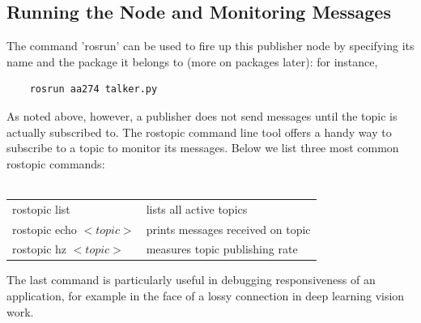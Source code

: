 \documentclass[twoside]{article}
\begin{document}
\subsection{Running the Node and Monitoring Messages}
The command 'rosrun' can be used to fire up this publisher node by specifying its name and the package it belongs to (more on packages later): for instance,
\begin{verbatim}
	rosrun aa274 talker.py
\end{verbatim}
As noted above, however, a publisher does not send messages until the topic is actually subscribed to. The rostopic command line tool offers a handy way to subscribe to a topic to monitor its messages. Below we list three most common rostopic commands:\\ \\
{\ttfamily
\begin{tabular}{l l}
rostopic list & lists all active topics \\
rostopic echo $<topic>$ & prints messages received on topic \\
rostopic hz $<topic>$ & measures topic publishing rate \\
\end{tabular}
}

The last command is particularly useful in debugging responsiveness of an application, for example in the face of a lossy connection in deep learning vision work.
\end{document}
